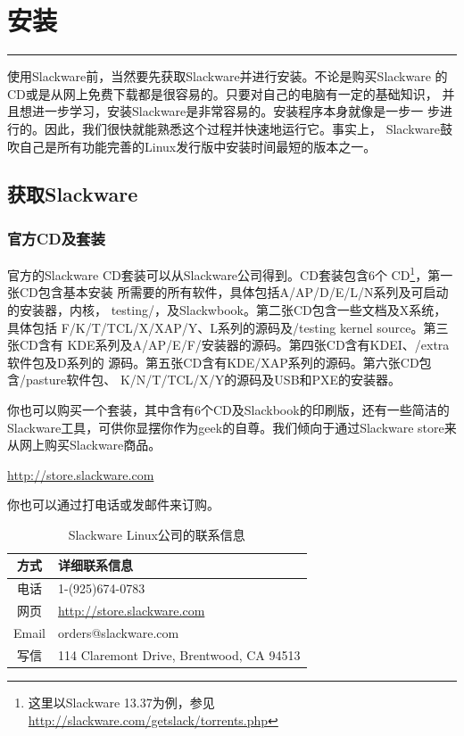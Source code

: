 
\chapter{安装}
\label{chap:installation}

\rule[0pt]{\textwidth}{.1pt}

使用Slackware前，当然要先获取Slackware并进行安装。不论是购买Slackware
的CD或是从网上免费下载都是很容易的。只要对自己的电脑有一定的基础知识，
并且想进一步学习，安装Slackware是非常容易的。安装程序本身就像是一步一
步进行的。因此，我们很快就能熟悉这个过程并快速地运行它。事实上，
Slackware鼓吹自己是所有功能完善的Linux发行版中安装时间最短的版本之一。

\section{获取Slackware}
\label{sec:installation:gettingSlackware}

\subsection{官方CD及套装}
\label{sec:installation:gettingSlackware:official}

官方的Slackware CD套装可以从Slackware公司得到。CD套装包含6个
CD\footnote{这里以Slackware 13.37为例，参见
\url{http://slackware.com/getslack/torrents.php}}，第一张CD包含基本安装
所需要的所有软件，具体包括A/AP/D/E/L/N系列及可启动的安装器，内核，
testing/，及Slackwbook。第二张CD包含一些文档及X系统，具体包括
F/K/T/TCL/X/XAP/Y、L系列的源码及/testing kernel source。第三张CD含有
KDE系列及A/AP/E/F/安装器的源码。第四张CD含有KDEI、/extra软件包及D系列的
源码。第五张CD含有KDE/XAP系列的源码。第六张CD包含/pasture软件包、
K/N/T/TCL/X/Y的源码及USB和PXE的安装器。

你也可以购买一个套装，其中含有6个CD及Slackbook的印刷版，还有一些简洁的
Slackware工具，可供你显摆你作为geek的自尊。我们倾向于通过Slackware
store来从网上购买Slackware商品。

\url{http://store.slackware.com}

你也可以通过打电话或发邮件来订购。

\begin{table}[htpb]
  \centering
  \begin{tabular}{c|l}
    \hline\hline 
  方式 & 详细联系信息  \\ \hline
  电话 & 1-(925)674-0783 \\
  网页 & \url{http://store.slackware.com} \\
  Email & orders@slackware.com \\
  写信 & 114 Claremont Drive, Brentwood, CA 94513 \\
  \hline \hline
  \end{tabular}
  \caption{Slackware Linux公司的联系信息}
  \label{tab:slackwareLinuxIncContactInformation}
\end{table}

